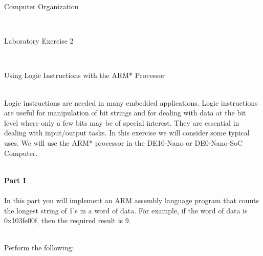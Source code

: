 \documentclass[epsfig,10pt,fullpage]{article}
\newcommand{\LabNum}{2}
\begin{document}
\centerline{\huge Computer Organization}
~\\
\centerline{\huge Laboratory Exercise \LabNum}
~\\
\centerline{\large Using Logic Instructions with the ARM* Processor}
~\\

\noindent
Logic instructions are needed in many embedded applications.  Logic instructions are useful 
for manipulation of bit strings and for dealing with data at the bit level where only a 
few bits may be of special interest.  They are essential in dealing with input/output tasks.
In this exercise we will consider some typical uses.
We will use the ARM* processor in the DE10-Nano or DE0-Nano-SoC Computer.

~\\
\noindent
{\bf Part I}
~\\
~\\
\noindent
In this part you will implement an ARM assembly language program that counts the longest 
string of 1's in a word of data. For example, if the word of data is {\sf 0x103fe00f}, then 
the required result is 9.

~\\
\noindent
Perform the following:
\end{document}
